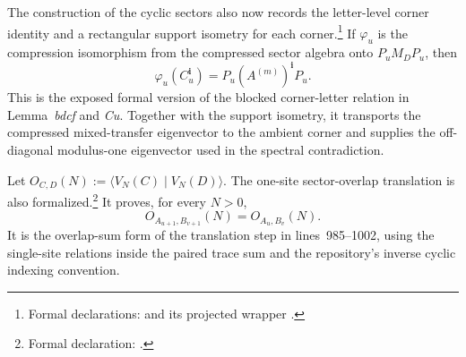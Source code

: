 \documentclass{article}
\begin{document}
The construction of the cyclic sectors also now records the letter-level
corner identity and a rectangular support isometry for each corner.\footnote{Formal
declarations:
and its projected wrapper
.}
If $\varphi_u$ is the compression isomorphism from the compressed sector algebra
onto $P_uM_DP_u$, then
\[
    \varphi_u(C_u^{\mathbf i})=
        P_u (A^{(m)})^{\mathbf i} P_u .
\]
This is the exposed formal version of the blocked corner-letter relation in
Lemma~\emph{bdcf} and \emph{Cu}. Together with the support isometry, it transports
the compressed mixed-transfer eigenvector to the ambient corner and supplies the
off-diagonal modulus-one eigenvector used in the spectral contradiction.

Let $O_{C,D}(N):=\langle V_N(C)\mid V_N(D)\rangle$. The one-site
sector-overlap translation is also formalized.\footnote{Formal declaration:
.} It proves, for every
$N>0$,
\[
    O_{A_{u+1},B_{v+1}}(N)=O_{A_u,B_v}(N).
\]
It is the overlap-sum form of the translation step in lines~985--1002, using
the single-site relations inside the paired trace sum and the repository's
inverse cyclic indexing convention.
\end{document}
